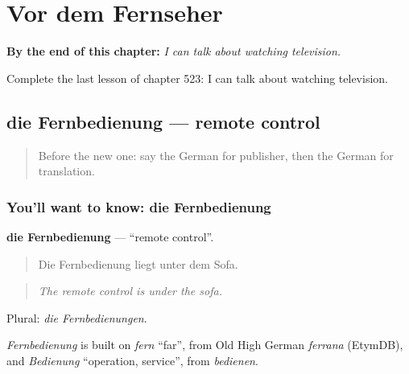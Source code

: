 
\chapter{Vor dem Fernseher}
\label{ch:ge-vor-dem-fernseher}

\begin{chapteropening}
\textbf{By the end of this chapter:} \emph{I can talk about watching television.}

Complete the last lesson of chapter 523: I can talk about watching television.
\end{chapteropening}

\section[die Fernbedienung]{die Fernbedienung — remote control}

\label{lesson:GE-C523-fernbedienung}



\begin{quote}
Before the new one: say the German for publisher, then the German for translation.
\end{quote}

\subsection*{You'll want to know: die Fernbedienung}
\textbf{die Fernbedienung} — \textquotedblleft{}remote control\textquotedblright{}.

\begin{quote}
Die Fernbedienung liegt unter dem Sofa.
\end{quote}

\begin{quote}
\emph{The remote control is under the sofa.}
\end{quote}

Plural: \emph{die Fernbedienungen}.

\begin{cousinweb}
\emph{Fernbedienung} is built on \emph{fern} \textquotedblleft{}far\textquotedblright{}, from Old High German \emph{ferrana} (EtymDB), and \emph{Bedienung} \textquotedblleft{}operation, service\textquotedblright{}, from \emph{bedienen}.
\end{cousinweb}

